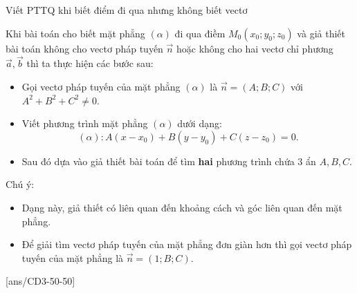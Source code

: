 \begin{dang}{Viết PTTQ khi biết điểm đi qua nhưng không biết vectơ}
\end{dang}
\begin{tomtat}
	Khi bài toán cho biết mặt phẳng $(\alpha)$ đi qua điềm $M_0\left(x_0 ; y_0 ; z_0\right)$ và giả thiết bài toán không cho vectơ pháp tuyến $\overrightarrow{n}$ hoặc không cho hai vectơ chỉ phương $\overrightarrow{a}, \overrightarrow{b}$ thì ta thực hiện các bước sau:
	\begin{itemize}
		\item Gọi vectơ pháp tuyến của mặt phẳng $(\alpha)$ là $\overrightarrow{n}=(A ; B ; C)$ với $A^2+B^2+C^2 \neq 0$.
		\item Viết phương trình mặt phẳng $(\alpha)$ dưới dạng:
		$$
		(\alpha)\colon A\left(x-x_0\right)+B\left(y-y_0\right)+C\left(z-z_0\right)=0.
		$$
		\item Sau đó dựa vào giả thiết bài toán để tìm \textbf{hai} phương trình chứa 3 ẩn $A, B, C$.
	\end{itemize}
	Chú ý:
	\begin{itemize}
		\item Dạng này, giả thiết có liên quan đến khoảng cách và góc liên quan đến mặt phẳng.
		\item Để giải tìm vectơ pháp tuyến của mặt phẳng đơn giàn hơn thì gọi vectơ pháp tuyến của mặt phẳng là $\overrightarrow{n}=(1 ; B ; C)$.
	\end{itemize}
\end{tomtat}

[ans/CD3-50-50]
\TN

